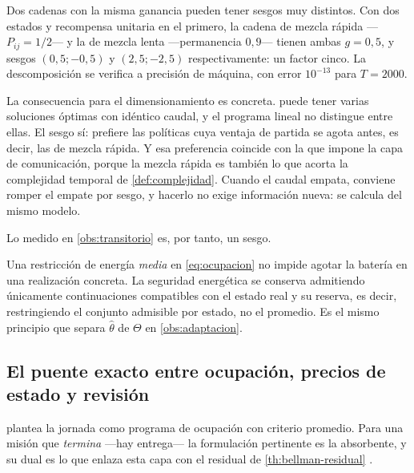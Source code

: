 \begin{observacion}
\label{obs:sesgo-desempate}
Dos cadenas con la misma ganancia pueden tener sesgos muy distintos. Con dos
estados y recompensa unitaria en el primero, la cadena de mezcla rápida
—$P_{ij}=1/2$— y la de mezcla lenta —permanencia $0{,}9$— tienen ambas
$g=0{,}5$, y sesgos $(0{,}5;-0{,}5)$ y $(2{,}5;-2{,}5)$ respectivamente: un factor
cinco. La descomposición se verifica a precisión de máquina, con error
$10^{-13}$ para $T=2000$.

La consecuencia para el dimensionamiento es concreta.  puede
tener varias soluciones óptimas con idéntico caudal, y el programa lineal no
distingue entre ellas. El sesgo sí: prefiere las políticas cuya ventaja de
partida se agota antes, es decir, las de mezcla rápida. Y esa preferencia
coincide con la que impone la capa de comunicación, porque la mezcla rápida es
también lo que acorta la complejidad temporal de \cref{def:complejidad}. Cuando
el caudal empata, conviene romper el empate por sesgo, y hacerlo no exige
información nueva: se calcula del mismo modelo.

Lo medido en \cref{obs:transitorio} es, por tanto, un sesgo.
\end{observacion}

\begin{observacion}
\label{obs:media-energia}
Una restricción de energía \emph{media} en \eqref{eq:ocupacion} no impide agotar
la batería en una realización concreta. La seguridad energética se conserva
admitiendo únicamente continuaciones compatibles con el estado real y su
reserva, es decir, restringiendo el conjunto admisible por estado, no el
promedio. Es el mismo principio que separa $\hat\theta$ de $\Theta$ en
\cref{obs:adaptacion}.
\end{observacion}

\subsection{El puente exacto entre ocupación, precios de estado y revisión}

 plantea la jornada como programa de ocupación con criterio
promedio. Para una misión que \emph{termina} —hay entrega— la formulación
pertinente es la absorbente, y su dual es lo que enlaza esta capa con el residual
de \cref{th:bellman-residual} \cite{mayorga2026m1}.

